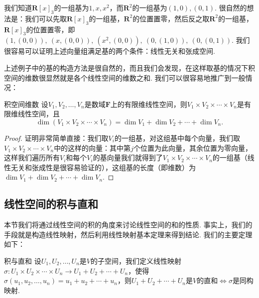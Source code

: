 \begin{solution}
    我们知道$\mathbf{R}[x]_3$的一组基为$1,x,x^2$，而$\mathbf{R}^2$的一组基为$(1,0),(0,1)$. 很自然的想法是：我们可以先取$\mathbf{R}[x]_3$的一组基，$\mathbf{R}^2$的位置置零，然后反之取$\mathbf{R}^2$的一组基，$\mathbf{R}[x]_3$的位置置零，即$(1,(0,0)),\ (x,(0,0)),\ (x^2,(0,0)),\ (0,(1,0)),\ (0,(0,1))$. 我们很容易可以证明上述向量组满足基的两个条件：线性无关和张成空间.
\end{solution}

上述例子中的基的构造方法是很自然的，而且我们会发现，在这样取基的情况下积空间的维数很显然就是各个线性空间的维数之和. 我们可以很容易地推广到一般情况：
\begin{theorem}{}{积空间维数}
    设$V_1,V_2,\ldots,V_n$是数域$\mathbf{F}$上的有限维线性空间，则$V_1 \times V_2 \times \cdots \times V_n$是有限维线性空间，且
    \[\dim(V_1 \times V_2 \times \cdots \times V_n)=\dim V_1+\dim V_2+\cdots+\dim V_n.\]
\end{theorem}

\begin{proof}
    证明非常简单直接：我们取$V_i$的一组基，对这组基中每个向量，我们取$V_1 \times V_2 \times \cdots \times V_n$中的这样的向量：其中第$j$个位置为此向量，其余位置为零向量，这样我们遍历所有$V_i$和每个$V_i$的基向量我们就得到了$V_1 \times V_2 \times \cdots \times V_n$的一组基（线性无关和张成性是很容易验证的），这组基的长度（即维数）为$\dim V_1+\dim V_2+\cdots+\dim V_n$.
\end{proof}

\subsection{线性空间的积与直和}

本节我们将通过线性空间的积的角度来讨论线性空间的和的性质. 事实上，我们的手段就是构造线性映射，然后利用线性映射基本定理来得到结论. 我们的主要定理如下：
\begin{theorem}{}{积与直和}
    设$U_1,U_2,\ldots,U_n$是$V$的子空间，我们定义线性映射$\sigma:U_1 \times U_2 \times \cdots \times U_n \to U_1+U_2+\cdots+U_n$，使得$\sigma(u_1,u_2,\ldots,u_n)=u_1+u_2+\cdots+u_n$，则$U_1+U_2+\cdots+U_n$是$V$的直和$\iff \sigma$是同构映射.
\end{theorem}


